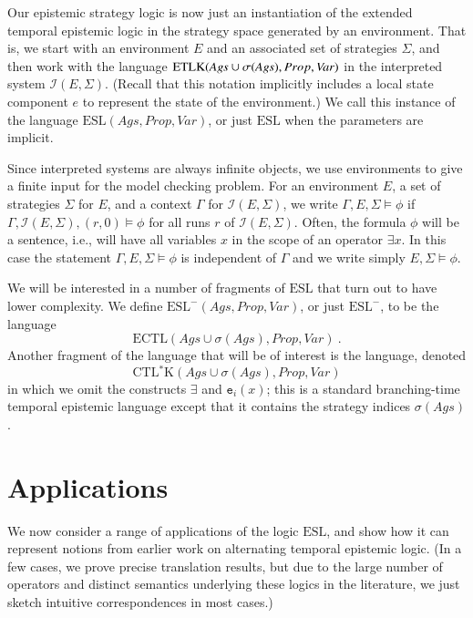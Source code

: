 \documentclass[a4wide]{article}
\newcommand{\ECTL}{\mbox{ECTL}}
\newcommand{\CTLsK}{\mbox{CTL$^*$K}}
\newcommand{\ESL}{\mbox{ESL}}
\newcommand{\Prop}{Prop}
\newcommand{\SVar}{V\!ar}
\theoremstyle{examplesty}
\newcommand{\strat}{\sigma}
\newcommand{\Ags}{\mathit{Ags}}
\newcommand{\I}{\mathcal{I}}
\newcommand{\lid}[2]{\mathtt{e}_{#1}(#2)}
\newcommand{\Env}{E}
\newcommand{\Strat}{\Sigma}
\newcommand{\Strats}{\Sigma}
\newcommand{\Cont}{\Gamma}
\newcommand{\ETL}{{\rm ETLK}}
\begin{document}
Our epistemic strategy logic is now just  an instantiation of the extended temporal epistemic 
logic in the strategy space generated by an environment. That is, we start with an environment $\Env$
and an associated set of strategies $\Strats$, 
and then work with the language 
$\ETL(\Ags\cup \strat(\Ags), \Prop, \SVar)$
in the interpreted system  $\I(\Env,\Strats)$. 
(Recall that this notation implicitly includes a local state component $e$ to represent the state of the environment.) 
We call this instance of the language $\ESL(\Ags, \Prop, \SVar)$, or just $\ESL$ when the 
parameters are implicit. 

Since interpreted systems are always infinite objects, we use environments to give a finite input for the model checking problem. 
For an environment $\Env$, a set of strategies $\Strat$ for $\Env$, and a context $\Cont$ for  $ \I(\Env, \Strat)$, 
we write $\Cont, E,\Strat\models \phi$ if  $\Cont, \I(\Env, \Strat),(r,0)\models \phi$ 
for all runs $r$ of  $\I(\Env, \Strat)$. 
Often, the formula $\phi$ will be a sentence, i.e., will have all variables $x$ in the scope of an operator $\exists x$. 
In this case the statement $\Cont, \Env,\Strat\models \phi$ is independent of $\Cont$ and we write simply $\Env,\Strat\models \phi$.


We will be interested in a number of fragments of $\ESL$ that turn out to have lower complexity. 
We define $\ESL^-(\Ags, \Prop, \SVar)$, or just $\ESL^-$, 
to be the language 
$$\ECTL(\Ags\cup \strat(\Ags), \Prop, \SVar)~.$$
Another fragment of the language that will be of interest is 
the  language, 
denoted
$$\CTLsK(
\Ags
\cup \strat(\Ags), \Prop, \SVar)$$ 
in which we omit the constructs $\exists$ and $\lid{i}{x}$; this is a standard branching-time temporal epistemic
language except that it contains the 
strategy indices 
$\strat(\Ags)$.






\section{Applications}\label{sec:apps}

We now consider a range of applications of the logic $\ESL$,  
and show how it can represent notions from earlier work on alternating temporal epistemic logic. 
(In a few cases, we prove precise translation results, but due to the large number of operators and distinct semantics underlying 
these logics in the literature, we just sketch intuitive correspondences in most cases.)  
\end{document}
